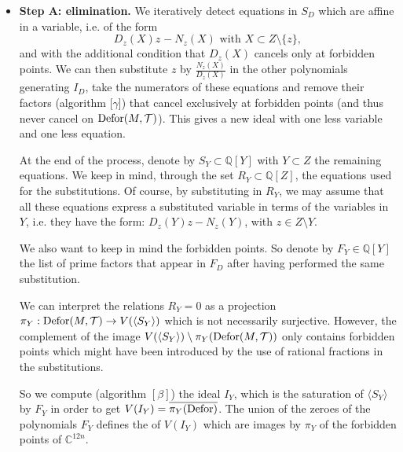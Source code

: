   \begin{itemize}
\item {\bf Step A: elimination.} 
We iteratively detect equations in $S_{D}$ which are affine in a variable, i.e.  of the form 
$$D_{z} ( X )  z_{} -N_{z} ( X )\textrm{ with }X \subset Z \setminus \{ z \},$$ 
and with the additional condition that $D_{z} ( X )$
  cancels only at forbidden points. We can then substitute $z$ by $\frac{N_{z} ( X )}{D_{z}
  ( X )}$ in the other polynomials generating $I_{D}$, take the numerators of
  these equations and remove their factors (algorithm [$\gamma$]) that cancel
  exclusively at forbidden points (and thus never cancel on $\operatorname{Defor} ( M,
  \mathcal{T} )$). This gives a new ideal with one less variable and one less equation.
  
At the end of the process, denote by $S_{Y} \subset \mathbb{Q} [ Y ]$ with $Y \subset Z$ the
  remaining equations. We keep in mind, through the set $R_{Y}
  \subset \mathbb{Q} [ Z ]$, the equations used for the substitutions. Of course, by substituting in $R_Y$, we may assume that all these equations express a substituted variable in terms of the variables in $Y$, i.e. they have the form: $D_{z} ( Y ) z-N_{z} ( Y )$, with $z
  \in Z \setminus Y$.
  
We also want to keep in mind the forbidden points. So denote by $F_{Y} \in \mathbb{Q} [ Y ]$
 the list of prime factors that appear in $F_{D}$ after having performed the same substitution.
  
We can interpret the relations $R_{Y} =0$ as a projection $\pi_{Y} : \operatorname{Defor} (
  M, \mathcal{T} ) \rightarrow V ( \langle S_{Y} \rangle )$ which is not
  necessarily surjective. However, the complement of the image $V ( \langle S_{Y}
  \rangle ) \setminus \pi_{Y} ( \operatorname{Defor} ( M, \mathcal{T} ) )$ only contains
  forbidden points which might have been introduced by the use of
  rational fractions in the substitutions.
  
  So we compute (algorithm $[ \beta ]$) the ideal $I_{Y}$, which is the saturation of $\langle S_{Y}  \rangle$ by $F_{Y}$ in order to get $V ( I_{Y} ) = \overline{\pi_{Y} (
  \operatorname{Defor} )}$. The union of the zeroes of the polynomials $F_{Y}$ defines
  the {} of $V ( I_{Y} )$ which are images by $\pi_{Y}$
  of the forbidden points of $\mathbb{C}^{12n}$.
  

\end{itemize}
